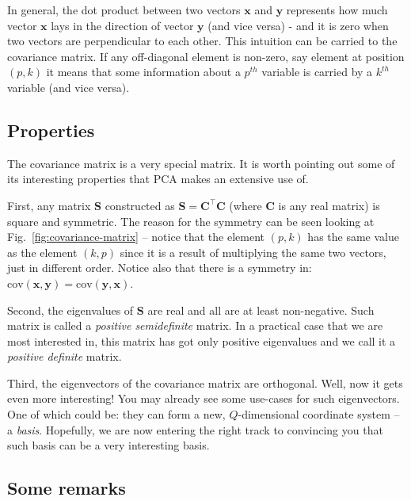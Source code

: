 \documentclass[10pt,twocolumn]{article}
\begin{document}
In general, the dot product between two vectors $\mathbf{x}$ and $\mathbf{y}$ represents how much vector $\mathbf{x}$ lays in the direction of vector $\mathbf{y}$ (and vice versa) - and it is zero when two vectors are perpendicular to each other. This intuition can be carried to the covariance matrix. If any off-diagonal element is non-zero, say element at position $(p,k)$ it means that some information about a $p^{th}$ variable is carried by a $k^{th}$ variable (and vice versa).

\subsection{Properties} \label{sec:covariance-properties}

The covariance matrix is a very special matrix. It is worth pointing out some of its interesting properties that PCA makes an extensive use of.

First, any matrix $\mathbf{S}$ constructed as $\mathbf{S} = \mathbf{C}^{\top} \mathbf{C}$ (where $\mathbf{C}$ is any real matrix) is square and symmetric. The reason for the symmetry can be seen looking at Fig.~\ref{fig:covariance-matrix} -- notice that the element $(p,k)$ has the same value as the element $(k,p)$ since it is a result of multiplying the same two vectors, just in different order. Notice also that there is a symmetry in: $\text{cov}(\mathbf{x},\mathbf{y}) = \text{cov}(\mathbf{y},\mathbf{x})$. 

Second, the eigenvalues of $\mathbf{S}$ are real and all are at least non-negative. Such matrix is called a \textit{positive semidefinite} matrix. In a practical case that we are most interested in, this matrix has got only positive eigenvalues and we call it a \textit{positive definite} matrix.

Third, the eigenvectors of the covariance matrix are orthogonal. Well, now it gets even more interesting! You may already see some use-cases for such eigenvectors. One of which could be: they can form a new, $Q$-dimensional coordinate system -- a \textit{basis}. 
Hopefully, we are now entering the right track to convincing you that such basis can be a very interesting basis.


\subsection{Some remarks}
\end{document}
